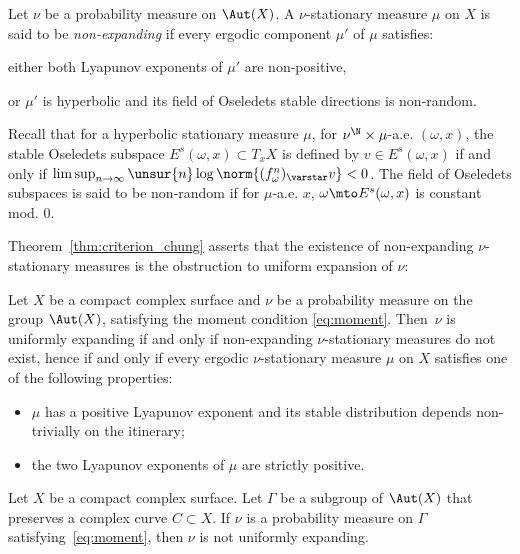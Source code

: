 
\begin{defi}\label{defi:non_expanding_measure}
Let $\nu$ be a probability measure on $\Aut(X)$. A
$\nu$-stationary measure $\mu$ on $X$ is said to be
\emph{non-expanding} if
every ergodic component $\mu'$ of $\mu$ satisfies:
\begin{enumeratei}
\item\label{defi:non_expanding_measurei} either both Lyapunov exponents of $\mu'$ are non-positive,
\item\label{defi:non_expanding_measureii} or $\mu'$ is hyperbolic and its field of Oseledets stable directions is non-random.
\end{enumeratei}
\end{defi}

Recall that for a hyperbolic stationary measure $\mu$, for $\nu^\N\times \mu$-a.e. $(\omega, x)$, the stable Oseledets subspace $E^s(\omega, x)\subset T_xX$ is defined by
$v\in E^s(\omega, x)$ if and only if $\limsup_{n\to\infty} \unsur{n}\log \norm{(f_\omega^n)_\varstar v}<0$. The field of Oseledets subspaces is said to be non-random if for $\mu$-a.e. $x$,
$\omega\mto E^s(\omega, x)$ is constant mod. $0$.

Theorem~\ref{thm:criterion_chung} asserts that the existence
of non-expanding $\nu$-stationary measures is the obstruction to uniform expansion of $\nu$:

\begin{cor} \label{cor:criterion_chung}
Let $X$ be a compact complex surface and $\nu$ be a probability measure on the group $\Aut(X)$, satisfying the moment condition \eqref{eq:moment}.
Then~$\nu$ is uniformly expanding if
and only if non-expanding $\nu$-stationary measures do not exist, hence
if and only if every ergodic $\nu$-stationary measure $\mu$ on $X$ satisfies one of the following properties:
\begin{itemize}
\item $\mu$ has a positive Lyapunov exponent and its stable distribution depends non-trivially on the itinerary;
\item the two Lyapunov exponents of $\mu$ are strictly positive.
\end{itemize} \end{cor}


\begin{pro}\label{pro:invariant_curve}
Let $X$ be a compact complex surface. Let
$\Gamma$ be a subgroup of $\Aut(X)$ that preserves a complex curve $C\subset X$. If $\nu$ is a probability measure on $\Gamma$ satisfying~\eqref{eq:moment}, then $\nu$ is not uniformly expanding.
\end{pro}

